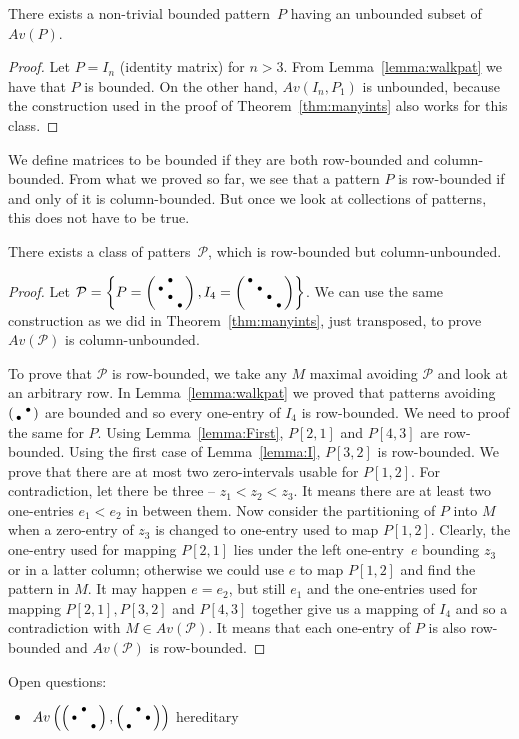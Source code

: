 \begin{obs}
There exists a non-trivial bounded pattern~$P$ having an unbounded subset of $Av(P)$.
\end{obs}
\begin{proof}
Let $P=I_n$ (identity matrix) for $n>3$. From Lemma~\ref{lemma:walkpat} we have that $P$ is bounded. On the other hand, $Av(I_n,P_1)$ is unbounded, because the construction used in the proof of Theorem~\ref{thm:manyints} also works for this class.
\end{proof}

We define matrices to be bounded if they are both row-bounded and column-bounded. From what we proved so far, we see that a pattern $P$ is row-bounded if and only of it is column-bounded. But once we look at collections of patterns, this does not have to be true.

\begin{lemma}
There exists a class of patters~$\mathcal{P}$, which is row-bounded but column-unbounded.
\end{lemma}
\begin{proof}
Let $\mathcal{P}=\left\lbrace P=\left(\begin{smallmatrix} &\bullet& \\\bullet& & \\ &\bullet& \\ & &\bullet\end{smallmatrix}\right),I_4=\left(\begin{smallmatrix}\bullet& & & \\ &\bullet& & \\ & &\bullet& \\ & & &\bullet\end{smallmatrix}\right)\right\rbrace$. We can use the same construction as we did in Theorem~\ref{thm:manyints}, just transposed, to prove $Av(\mathcal{P})$ is column-unbounded.

To prove that $\mathcal{P}$ is row-bounded, we take any $M$ maximal avoiding $\mathcal{P}$ and look at an arbitrary row. In Lemma~\ref{lemma:walkpat} we proved that patterns avoiding $\left(\begin{smallmatrix} &\bullet\\\bullet& \end{smallmatrix}\right)$ are bounded and so every one-entry of $I_4$ is row-bounded. We need to proof the same for $P$. Using Lemma~\ref{lemma:First}, $P[2,1]$ and $P[4,3]$ are row-bounded. Using the first case of Lemma~\ref{lemma:I}, $P[3,2]$ is row-bounded. We prove that there are at most two zero-intervals usable for $P[1,2]$. For contradiction, let there be three -- $z_1<z_2<z_3$. It means there are at least two one-entries $e_1<e_2$ in between them. Now consider the partitioning of $P$ into $M$ when a zero-entry of $z_3$ is changed to one-entry used to map $P[1,2]$. Clearly, the one-entry used for mapping $P[2,1]$ lies under the left one-entry~$e$ bounding $z_3$ or in a latter column; otherwise we could use $e$ to map $P[1,2]$ and find the pattern in $M$. It may happen $e=e_2$, but still $e_1$ and the one-entries used for mapping $P[2,1],P[3,2]$ and $P[4,3]$ together give us a mapping of $I_4$ and so a contradiction with $M\in Av(\mathcal{P})$. It means that each one-entry of $P$ is also row-bounded and $Av(\mathcal{P})$ is row-bounded.
\end{proof}

Open questions:
\begin{itemize}
	\item $Av\left(\left(\begin{smallmatrix} &\bullet& \\\bullet& & \\ & &\bullet\end{smallmatrix}\right),\left(\begin{smallmatrix} &\bullet& \\ & &\bullet\\\bullet& & \end{smallmatrix}\right)\right)$ hereditary
\end{itemize}